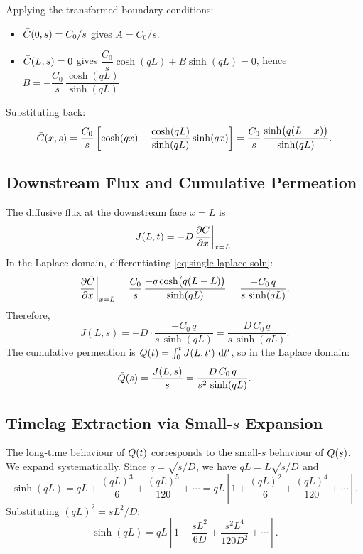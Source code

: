 Applying the transformed boundary conditions:
\begin{itemize}
  \item $\bar{C}(0,s) = C_0/s$ gives $A = C_0/s$.
  \item $\bar{C}(L,s) = 0$ gives
    $\dfrac{C_0}{s}\cosh(qL) + B\sinh(qL) = 0$, hence
    $B = -\dfrac{C_0}{s}\,\dfrac{\cosh(qL)}{\sinh(qL)}$.
\end{itemize}
Substituting back:
\begin{equation}
  \label{eq:single-laplace-soln}
  \bar{C}(x,s) = \frac{C_0}{s}\left[\cosh(qx)
    - \frac{\cosh(qL)}{\sinh(qL)}\sinh(qx)\right]
  = \frac{C_0}{s}\,\frac{\sinh\bigl(q(L-x)\bigr)}{\sinh(qL)}.
\end{equation}

\subsection{Downstream Flux and Cumulative Permeation}
\label{sec:single-downstream}

The diffusive flux at the downstream face $x = L$ is
\begin{equation}
  J(L,t) = -D\,\pdv{C}{x}\bigg|_{x=L}.
\end{equation}
In the Laplace domain, differentiating \cref{eq:single-laplace-soln}:
\begin{equation}
  \pdv{\bar{C}}{x}\bigg|_{x=L}
  = \frac{C_0}{s}\,\frac{-q\cosh\bigl(q(L-L)\bigr)}{\sinh(qL)}
  = \frac{-C_0\,q}{s\,\sinh(qL)}.
\end{equation}
Therefore,
\begin{equation}
  \label{eq:single-flux-laplace}
  \bar{J}(L,s) = -D\cdot\frac{-C_0\,q}{s\,\sinh(qL)}
  = \frac{D\,C_0\,q}{s\,\sinh(qL)}.
\end{equation}
The cumulative permeation is $Q(t) = \int_0^t J(L,t')\,\dd{t'}$, so in the
Laplace domain:
\begin{equation}
  \label{eq:single-cum-laplace}
  \bar{Q}(s) = \frac{\bar{J}(L,s)}{s}
  = \frac{D\,C_0\,q}{s^2\,\sinh(qL)}.
\end{equation}

\subsection{Timelag Extraction via Small-\texorpdfstring{$s$}{s} Expansion}
\label{sec:single-timelag}

The long-time behaviour of $Q(t)$ corresponds to the small-$s$ behaviour of
$\bar{Q}(s)$.  We expand systematically.  Since $q = \sqrt{s/D}$, we have
$qL = L\sqrt{s/D}$ and
\begin{equation}
  \label{eq:sinh-expansion}
  \sinh(qL) = qL + \frac{(qL)^3}{6} + \frac{(qL)^5}{120} + \cdots
  = qL\left[1 + \frac{(qL)^2}{6} + \frac{(qL)^4}{120} + \cdots\right].
\end{equation}
Substituting $(qL)^2 = sL^2/D$:
\begin{equation}
  \sinh(qL) = qL\left[1 + \frac{sL^2}{6D} + \frac{s^2 L^4}{120 D^2}
  + \cdots\right].
\end{equation}

